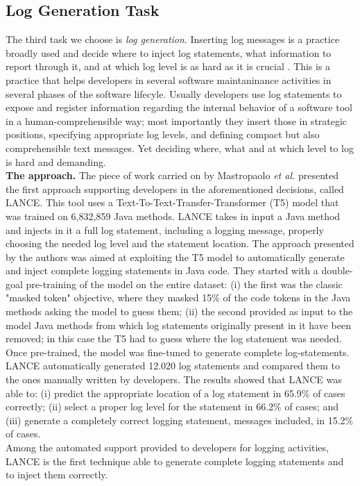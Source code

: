\subsection{Log Generation Task}
The third task we choose is \textit{log generation}.
Inserting log messages is a practice broadly used and decide where to inject log statements, what information to report through it, 
and at which log level is as hard as it is crucial \cite{Mastropaolo2022}. 
This is a practice that helps developers in several software maintaninance activities in several 
phases of the software lifecyle. Usually developers use log statements to expose and register information 
regarding the internal behavior of a software tool in a human-comprehensible way; most importantly they insert those
in strategic positions, specifying appropriate log levels, and defining 
compact but also comprehensible text messages. Yet deciding where, what and at which level to log is
hard and demanding.\\ 
\newline
\textbf{The approach.} The piece of work carried on by Mastropaolo \textit{et al.} \cite{Mastropaolo2022} presented the first 
approach supporting developers in the aforementioned decisions, called LANCE. This tool uses 
a Text-To-Text-Transfer-Transformer (T5) model that was trained on 6,832,859 Java methods.
LANCE takes in input a Java method and injects in it a full log statement, including 
a logging message, properly choosing the needed log level and the statement location.
The approach presented by the authors was aimed at exploiting the T5 model to automatically
generate and inject complete logging statements in Java code. 
They started with a double-goal pre-training of the model on the entire dataset: (i) the first was the classic 
"masked token" objective, where they masked 15\% of the code tokens in the Java methods asking the model 
to guess them; (ii) the second provided as input to the model Java methods from which log statements 
originally present in it have been removed; in this case the T5 had to guess
where the log statement was needed. Once pre-trained, the model was fine-tuned 
to generate complete log-statements. LANCE automatically generated 12.020 log statements
and compared them to the ones manually written by developers. The results 
showed that LANCE was able to: (i) predict the appropriate location of a log statement 
in 65.9\% of cases correctly; (ii) select a proper log level for the statement in 66.2\% of cases; and 
(iii) generate a completely correct logging statement, messages included, in 15.2\% of cases.\\
\newline
Among the automated support provided to developers for logging activities, LANCE is the first
technique able to generate complete logging statements and to inject them correctly.






